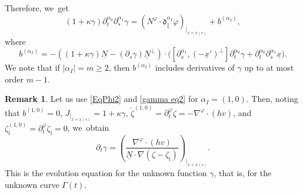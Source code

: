 \documentclass[10pt]{amsart}
\newcommand{\dpar}{{\mathfrak d}_{\parallel}}
\newcommand{\dt}{\partial_t}
\newcommand{\ul}[1]{\underline{#1}}
\newcommand{\itGamma}{\mathit{\Gamma}}
\theoremstyle{definition}
\newtheorem{remark}[theorem]{Remark}
\begin{document}
Therefore, we~get
\begin{equation}\label{gamma eq2}
(1+\kappa\gamma)\dt^{\alpha_0}\partial_s^{\alpha_1}\gamma
=(N^\varphi\cdot\dpar^{\alpha_I}\varphi)_{\vert_{x=\ul{x}(s)}} + b^{(\alpha_I)},
\end{equation}
where
\[
b^{(\alpha_I)} = -((1+\kappa\gamma)\ul{N} - (\partial_s\gamma)\ul{N}^\perp)\cdot
\bigl([\partial_s^{\alpha_1},(-\ul{x}')^\perp]\dt^{\alpha_0}\gamma + \dt^{\alpha_0}\partial_s^{\alpha_1}\ul{x} \bigr).
\]
We note that if $|\alpha_I|=m\geq2$, then $b^{(\alpha_I)}$ includes derivatives of $\gamma$ up to at most order $m-1$.

\begin{remark}\label{re:EEg}
Let us use \eqref{EqPhi2} and \eqref{gamma eq2} for $\alpha_I\!=\!(1,0)$.
Then, noting that $b^{(1,0)}\!=\!0$, $J_{\vert_{x=\ul{x}(s)}}=1+\kappa\gamma$, $\check{\zeta}^{(1,0)}=\dt^\varphi\zeta=-\nabla^\varphi\cdot(hv)$, and
$\zeta_\mathrm{i}^{(1,0)}=\dt^\varphi\zeta_\mathrm{i}=0$, we~obtain
\[
\dt\gamma = \left(\frac{\nabla^\varphi\cdot(hv)}{\ul{N}\cdot\nabla(\zeta-\zeta_\mathrm{i})} \right)_{\vert_{x=\ul{x}(s)}}.
\]
This is the evolution equation for the unknown function $\gamma$, that is, for the unknown curve $\itGamma(t)$.
\end{remark}
\end{document}
